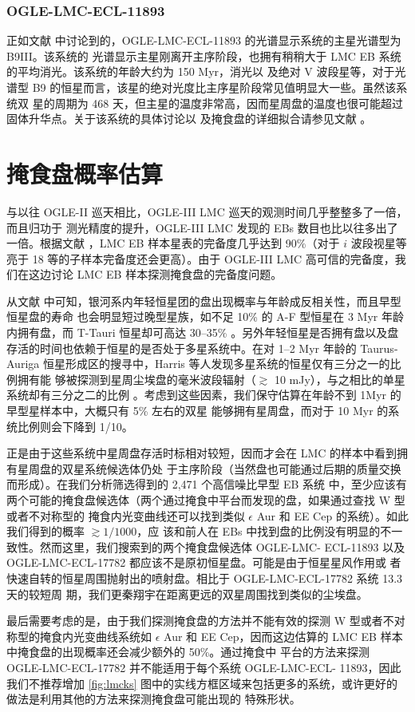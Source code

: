 \subsubsection{OGLE-LMC-ECL-11893} \label{sec:lmc11893}

正如文献  中讨论到的，OGLE-LMC-ECL-11893 的光谱显示系统的主星光谱型为 B9III。该系统的
光谱显示主星刚离开主序阶段，也拥有稍稍大于 LMC EB 系统的平均消光。该系统的年龄大约为 150 Myr，消光以
及绝对 V 波段星等，对于光谱型 B9 的恒星而言，该星的绝对光度比主序星阶段常见值明显大一些。虽然该系统双
星的周期为 468 天，但主星的温度非常高，因而星周盘的温度也很可能超过固体升华点。关于该系统的具体讨论以
及掩食盘的详细拟合请参见文献 。


\section{掩食盘概率估算} \label{sec:discebdiscuz}

与以往 OGLE-II 巡天\cite{Wyrzykowski2003}相比，OGLE-III LMC 巡天的观测时间几乎整整多了一倍，而且归功于
测光精度的提升，OGLE-III LMC 发现的 EBs 数目也比以往多出了一倍。根据文献 ，LMC EB 
样本星表的完备度几乎达到 90\%（对于 $i$ 波段视星等亮于 18 等的子样本完备度还会更高）。由于 OGLE-III 
LMC 高可信的完备度，我们在这边讨论 LMC EB 样本探测掩食盘的完备度问题。

从文献  中可知，银河系内年轻恒星团的盘出现概率与年龄成反相关性，而且早型恒星盘的寿命
也会明显短过晚型星族，如不足 10\% 的 A-F 型恒星在 3 Myr 年龄内拥有盘，而 T-Tauri 恒星却可高达 30--35\%
\cite{Hernandez2007}。另外年轻恒星是否拥有盘以及盘存活的时间也依赖于恒星的是否处于多星系统中。在对 
1--2 Myr 年龄的 Taurus-Auriga 恒星形成区的搜寻中，Harris 等人发现多星系统的恒星仅有三分之一的比例拥有能
够被探测到星周尘埃盘的毫米波段辐射（$\gtrsim$ 10 mJy），与之相比的单星系统却有三分之二的比例
\cite{Harris2012}。考虑到这些因素，我们保守估算在年龄不到 1Myr 的早型星样本中，大概只有 5\% 左右的双星
能够拥有星周盘，而对于 10 Myr 的系统比例则会下降到 1/10。

正是由于这些系统中星周盘存活时标相对较短，因而才会在 LMC 的样本中看到拥有星周盘的双星系统候选体仍处
于主序阶段（当然盘也可能通过后期的质量交换而形成）。在我们分析筛选得到的 2,471 个高信噪比早型 EB 系统
中，至少应该有两个可能的掩食盘候选体（两个通过掩食中平台而发现的盘，如果通过查找 W 型或者不对称型的
掩食内光变曲线还可以找到类似 $\epsilon$ Aur 和 EE Cep 的系统）。如此我们得到的概率 $\gtrsim 1/1000$，应
该和前人在 EBs 中找到盘的比例没有明显的不一致性。然而这里，我们搜索到的两个掩食盘候选体 OGLE-LMC-
ECL-11893 以及 OGLE-LMC-ECL-17782 都应该不是原初恒星盘。可能是由于恒星星风作用\cite{Graczyk2011}或
者快速自转的恒星周围抛射出的喷射盘\cite{Rivinius2013}。相比于 OGLE-LMC-ECL-17782 系统 13.3 天的较短周
期，我们更秦翔宇在距离更远的双星周围找到类似的尘埃盘。

最后需要考虑的是，由于我们探测掩食盘的方法并不能有效的探测  W 型或者不对称型的掩食内光变曲线系统如 $
\epsilon$ Aur 和 EE Cep，因而这边估算的 LMC EB 样本中掩食盘的出现概率还会减少额外的 50\%。通过掩食中
平台的方法来探测 OGLE-LMC-ECL-17782 并不能适用于每个系统 OGLE-LMC-ECL- 11893，因此我们不推荐增加 
\ref{fig:lmcks} 图中的实线方框区域来包括更多的系统，或许更好的做法是利用其他的方法来探测掩食盘可能出现的
特殊形状。



